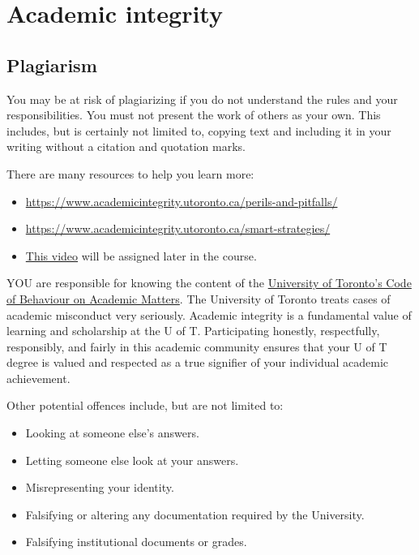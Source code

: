 \documentclass[
  openany]{book}
\begin{document}
\hypertarget{academic-integrity}{%
\section{Academic integrity}\label{academic-integrity}}

\hypertarget{plagiarism}{%
\subsection{Plagiarism}\label{plagiarism}}

You may be at risk of plagiarizing if you do not understand the rules and your responsibilities. You must not present the work of others as your own. This includes, but is certainly not limited to, copying text and including it in your writing without a citation and quotation marks.

There are many resources to help you learn more:

\begin{itemize}
\item
  \url{https://www.academicintegrity.utoronto.ca/perils-and-pitfalls/}
\item
  \url{https://www.academicintegrity.utoronto.ca/smart-strategies/}
\item
  \href{https://web.microsoftstream.com/video/496ed3f7-4136-420f-9108-b5f3605bc899}{This video} will be assigned later in the course.
\end{itemize}

YOU are responsible for knowing the content of the \href{http://www.governingcouncil.utoronto.ca/policies/behaveac.htm}{University of Toronto's Code of Behaviour on Academic Matters}. The University of Toronto treats cases of academic misconduct very seriously. Academic integrity is a fundamental value of learning and scholarship at the U of T. Participating honestly, respectfully, responsibly, and fairly in this academic community ensures that your U of T degree is valued and respected as a true signifier of your individual academic achievement.

Other potential offences include, but are not limited to:

\begin{itemize}
\item
  Looking at someone else's answers.
\item
  Letting someone else look at your answers.
\item
  Misrepresenting your identity.
\item
  Falsifying or altering any documentation required by the University.
\item
  Falsifying institutional documents or grades.
\end{itemize}
\end{document}
